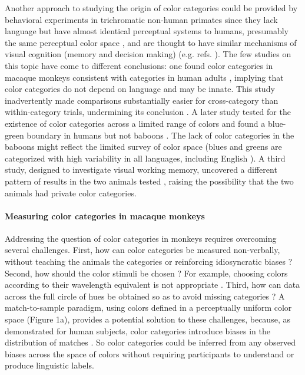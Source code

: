 \documentclass[9pt,biorxiv,lineno,onehalfspacing]{lapreprint}
\begin{document}
\begin{refsection}
Another approach to studying the origin of color categories could be provided by behavioral experiments in trichromatic non-human primates \citep{sandell_color_1979,carey_where_2009,RN18699,siuda-krzywicka_biological_2019} since they lack language but have almost identical perceptual systems to humans, presumably the same perceptual color space \citep{schnapf_spectral_1987,stoughton_psychophysical_2012,gagin_color-detection_2014, horwitz_what_2015}, and are thought to have similar mechanisms of visual cognition (memory and  decision making) (e.g. refs. \citep{panichello_error-correcting_2019,horwitz_what_2015}). The few studies on this topic have come to different conclusions: one found color categories in macaque monkeys consistent with categories in human adults \citep{sandell_color_1979}, implying that color categories do not depend on language and may be innate.
This study inadvertently made comparisons substantially easier for cross-category than within-category trials, undermining its conclusion \citep{davidoff_cross-species_2010}. 
A later study tested for the existence of color categories across a limited range of colors and found a blue-green boundary in humans but not baboons \citep{fagot_cross-species_2006,RN18699}. The lack of color categories in the baboons might reflect the limited survey of color space (blues and greens are categorized with high variability in all languages, including English \citep{gibson_color_2017}). A third study, designed to investigate visual working memory, uncovered a different pattern of results in the two animals tested \citep{panichello_error-correcting_2019}, raising the possibility that the two animals had private color categories. 

\paragraph{Measuring color categories in macaque monkeys}

Addressing the question of color categories in monkeys requires overcoming several challenges. 
First, how can color categories be measured non-verbally, without teaching the animals the categories or reinforcing idiosyncratic biases \citep{essock_color_1977,matsuno_color_2004}? 
Second, how should the color stimuli be chosen \citep{siuda-krzywicka_biological_2019}?
For example, choosing colors according to their wavelength equivalent 
\citep{sandell_color_1979} is not appropriate 
\citep{davidoff_cross-species_2010}.
Third, how can data across the full circle of hues be obtained so as to avoid missing categories \citep{fagot_cross-species_2006}? 
A match-to-sample paradigm, using colors defined in a perceptually uniform color space \citep{stockman_colorimetry_2010} (Figure 1a), provides a potential solution to these challenges, because, as demonstrated for human subjects, color categories introduce biases in the distribution of matches \citep{bae_why_2015}. 
So color categories could be inferred from any observed biases across the space of colors without requiring participants to understand or produce linguistic labels.  


\end{refsection}
\end{document}
